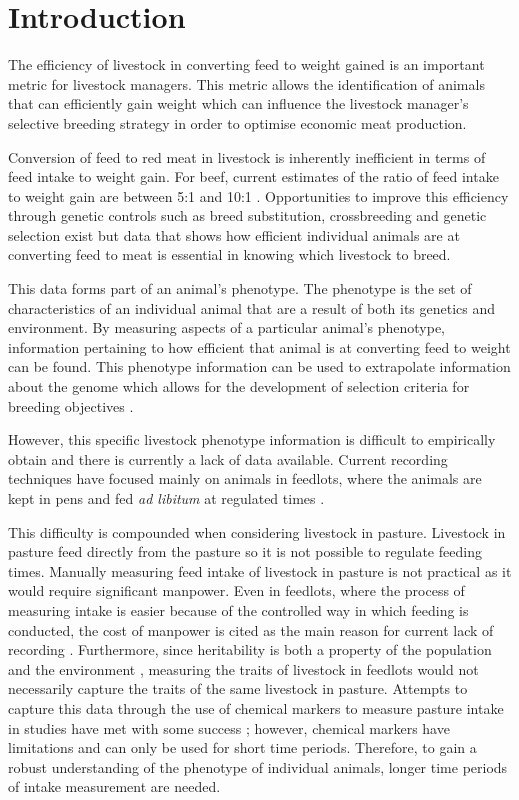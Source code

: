\chapter{Introduction}

The efficiency of livestock in converting feed to weight gained is an important metric for livestock managers. This metric allows the identification of animals that can efficiently gain weight which can influence the livestock manager's selective breeding strategy in order to optimise economic meat production. 

Conversion of feed to red meat in livestock is inherently inefficient in terms of feed intake to weight gain. For beef, current estimates of the ratio of feed intake to weight gain are between 5:1 and 10:1 \cite{Garnett2009}. Opportunities to improve this efficiency through genetic controls such as breed substitution, crossbreeding and genetic selection exist \cite{Hill2012} but data that shows how efficient individual animals are at converting feed to meat is essential in knowing which livestock to breed. 

This data forms part of an animal's phenotype. The phenotype is the set of characteristics of an individual animal that are a result of both its genetics and environment. By measuring aspects of a particular animal's phenotype, information pertaining to how efficient that animal is at converting feed to weight can be found. This phenotype information can be used to extrapolate information about the genome which allows for the development of selection criteria for breeding objectives \cite{Pollak2012}. 

However, this specific livestock phenotype information is difficult to empirically obtain and there is currently a lack of data available. Current recording techniques have focused mainly on animals in feedlots, where the animals are kept in pens and fed \textit{ad libitum} at regulated times \cite{Arthur2005}.

This difficulty is compounded when considering livestock in pasture. Livestock in pasture feed directly from the pasture so it is not possible to regulate feeding times. Manually measuring feed intake of livestock in pasture is not practical as it would require significant manpower. Even in feedlots, where the process of measuring intake is easier because of the controlled way in which feeding is conducted, the cost of manpower is cited as the main reason for current lack of recording \cite{Barwick2010}. Furthermore, since heritability is both a property of the population and the environment \cite{Falconer1996}, measuring the traits of livestock in feedlots would not necessarily capture the traits of the same livestock in pasture. Attempts to capture this data through the use of chemical  markers to measure pasture intake in studies have met with some success \cite{Barlow2009} \cite{Dove2006}; however, chemical markers have limitations and can only be used for short time periods. Therefore, to gain a robust understanding of the phenotype of individual animals, longer time periods of intake measurement are needed.

